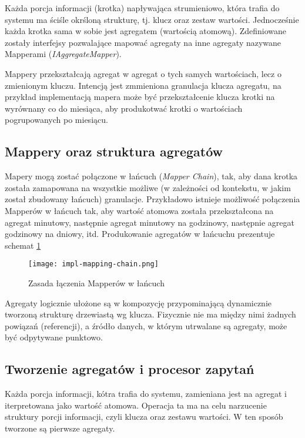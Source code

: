 Każda porcja informacji (krotka) napływająca strumieniowo, która trafia do systemu ma ściśle okrśloną strukturę, tj. klucz oraz zestaw wartości. Jednocześnie każda krotka sama w sobie jest agregatem (wartością atomową). Zdefiniowane zostały interfejsy pozwalające mapować agregaty na inne agregaty nazywane Mapperami (\emph{IAggregateMapper}).

Mappery przekształcają agregat w agregat o tych samych wartościach, lecz o zmienionym kluczu. Intencją jest zmmieniona granulacja klucza agregatu, na przykład implementacją mapera może być przekształcenie klucza krotki na wyrównany co do miesiąca, aby produkotwać krotki o wartościach pogrupowanych po miesiącu.



\subsection{Mappery oraz struktura agregatów}

Mapery mogą zostać połączone w łańcuch (\emph{Mapper Chain}), tak, aby dana krotka została zamapowana na wszystkie możliwe (w zależności od kontekstu, w jakim został zbudowany łańcuch) granulacje. Przykładowo istnieje możliwość połączenia Mapperów w łańcuch tak, aby wartość atomowa została przekształcona na agregat minutowy, następnie agregat minutowy na godzinowy, następnie agregat godzinowy na dniowy, itd. Produkowanie agregatów w łańcuchu prezentuje schemat \ref{fig:impl-mapping-chain}

\begin{figure}[h!]
  \centering
    \texttt{[image: impl-mapping-chain.png]}
  \caption{Zasada łączenia Mapperów w łańcuch}
  \label{fig:impl-mapping-chain}
\end{figure}

Agregaty logicznie ułożone są w kompozycję przypominającą dynamicznie tworzoną strukturę drzewiastą wg klucza. Fizycznie nie ma między nimi żadnych powiązań (referencji), a źródło danych, w którym utrwalane są agregaty, może być odpytywane punktowo.

\subsection{Tworzenie agregatów i procesor zapytań}

Każda porcja informacji, kótra trafia do systemu, zamieniana jest na agregat i iterpretowana jako wartość atomowa. Operacja ta ma na celu narzucenie struktury porcji informacji, czyli klucza oraz zestawu wartości. W ten sposób tworzone są pierwsze agregaty.

